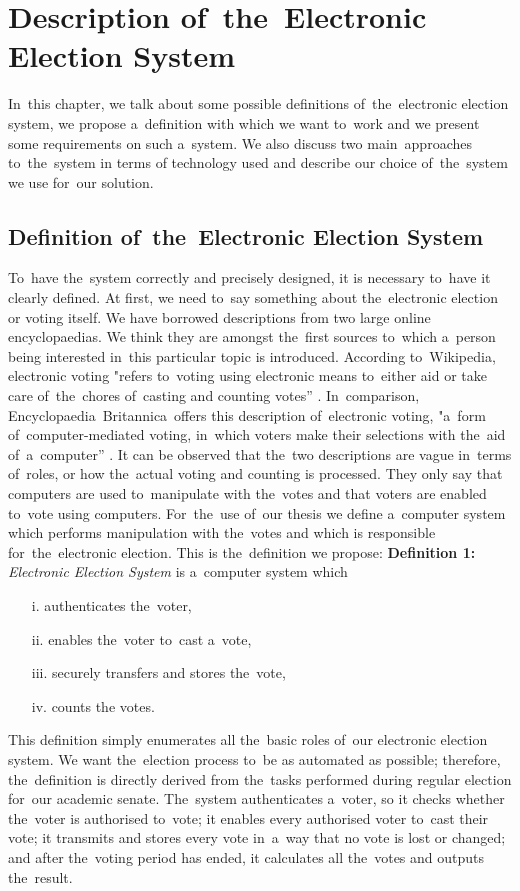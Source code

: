 \chapter{Description of~the~Electronic Election System}
\label{kap:definition}

In~this chapter, we talk about some possible definitions of~the~electronic election system, we propose a~definition with which we want to~work and we present some requirements on such a~system. We also discuss two main~approaches to~the~system in terms of technology used and describe our choice of~the~system we use for~our solution.

\section{Definition of~the~Electronic Election System}

\label{sec:def}

To~have the~system correctly and precisely designed, it is necessary to~have it clearly defined. At first, we need to~say something about the~electronic election or voting itself. We have borrowed descriptions from two large online encyclopaedias. We think they are amongst the~first sources to~which a~person being interested in~this particular topic is introduced. According to~Wikipedia, electronic voting "refers to~voting using electronic means to~either aid or take care of~the~chores of~casting and counting votes” \cite{Wiki}. In~comparison, Encyclopaedia~Britannica~offers this description of~electronic voting, "a~form of~computer-mediated voting, in~which voters make their selections with the~aid of~a~computer” \cite{Brit}. It can be observed that the~two descriptions are vague in~terms of~roles, or how the~actual voting and counting is processed. They only say that computers are used to~manipulate with the~votes and that voters are enabled to~vote using computers. For~the~use of~our thesis we define a~computer system which performs manipulation with the~votes and which is responsible for~the~electronic election. This is the~definition we propose:
\smallbreak
\textbf{Definition 1:} \emph{Electronic Election System} is a~computer system which
\begin{itemize}
\item[i.] authenticates the~voter,
\item[ii.] enables the~voter to~cast a~vote,
\item[iii.] securely transfers and stores the~vote,
\item[iv.] counts the votes.
\end{itemize}
\bigbreak
This definition simply enumerates all the~basic roles of~our electronic election system. We want the~election process to~be as automated as possible; therefore, the~definition is directly derived from the~tasks performed during regular election for~our academic senate. The~system authenticates a~voter, so it checks whether the~voter is authorised to~vote; it enables every authorised voter to~cast their vote; it transmits and stores every vote in~a~way that no vote is lost or changed; and after the~voting period has ended, it calculates all the~votes and outputs the~result.


